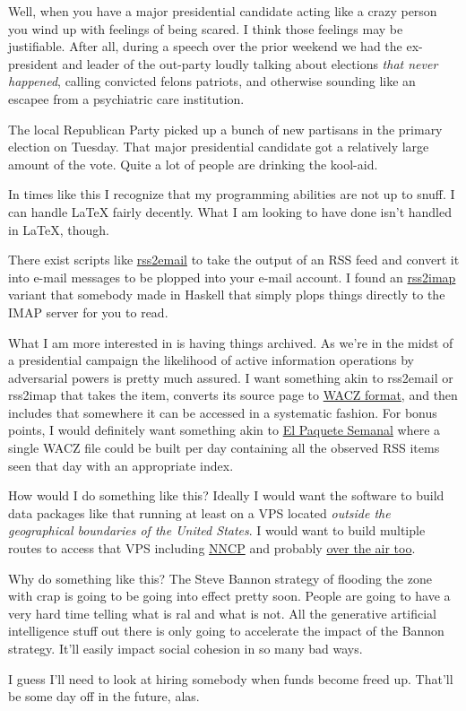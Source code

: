 Well, when you have a major presidential candidate acting like a crazy
person you wind up with feelings of being scared. I think those feelings
may be justifiable. After all, during a speech over the prior weekend we
had the ex-president and leader of the out-party loudly talking about
elections \emph{that never happened}, calling convicted felons patriots,
and otherwise sounding like an escapee from a psychiatric care
institution.

The local Republican Party picked up a bunch of new partisans in the
primary election on Tuesday. That major presidential candidate got a
relatively large amount of the vote. Quite a lot of people are drinking
the kool-aid.

In times like this I recognize that my programming abilities are not up
to snuff. I can handle LaTeX fairly decently. What I am looking to have
done isn't handled in LaTeX, though.

There exist scripts like
\href{https://github.com/rss2email/rss2email}{rss2email} to take the
output of an RSS feed and convert it into e-mail messages to be plopped
into your e-mail account. I found an
\href{https://github.com/cordawyn/rss2imap}{rss2imap} variant that
somebody made in Haskell that simply plops things directly to the IMAP
server for you to read.

What I am more interested in is having things archived. As we're in the
midst of a presidential campaign the likelihood of active information
operations by adversarial powers is pretty much assured. I want
something akin to rss2email or rss2imap that takes the item, converts
its source page to \href{https://specs.webrecorder.net/wacz/1.1.1/}{WACZ
format}, and then includes that somewhere it can be accessed in a
systematic fashion. For bonus points, I would definitely want something
akin to
\href{https://en.wikipedia.org/w/index.php?title=El_Paquete_Semanal&oldid=1211054142}{El
Paquete Semanal} where a single WACZ file could be built per day
containing all the observed RSS items seen that day with an appropriate
index.

How would I do something like this? Ideally I would want the software to
build data packages like that running at least on a VPS located
\emph{outside the geographical boundaries of the United States}. I would
want to build multiple routes to access that VPS including
\href{http://www.nncpgo.org/}{NNCP} and probably
\href{https://web.archive.org/web/20230927022215/https://www.nutsvolts.com/magazine/article/may2015_Steber}{over
the air too}.

Why do something like this? The Steve Bannon strategy of flooding the
zone with crap is going to be going into effect pretty soon. People are
going to have a very hard time telling what is ral and what is not. All
the generative artificial intelligence stuff out there is only going to
accelerate the impact of the Bannon strategy. It'll easily impact social
cohesion in so many bad ways.

I guess I'll need to look at hiring somebody when funds become freed up.
That'll be some day off in the future, alas.
